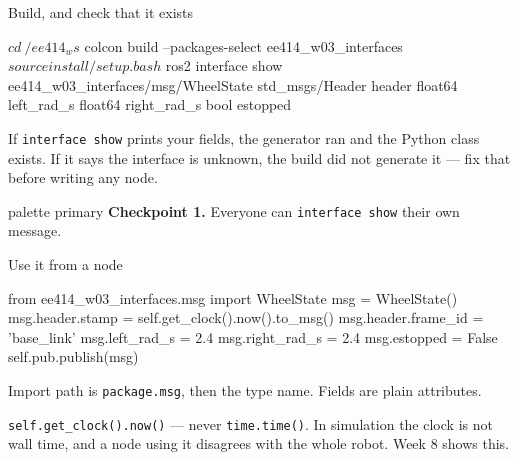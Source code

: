 \documentclass[aspectratio=169]{beamer}
\begin{document}
\begin{frame}[fragile]{Build, and check that it exists}
  \begin{shells}
$ cd ~/ee414_ws
$ colcon build --packages-select ee414_w03_interfaces
$ source install/setup.bash
$ ros2 interface show ee414_w03_interfaces/msg/WheelState
std_msgs/Header header
float64 left_rad_s
float64 right_rad_s
bool estopped
  \end{shells}

  \vspace{0.4em}
  \small
  If \texttt{interface show} prints your fields, the generator ran and the Python class exists.
  If it says the interface is unknown, the build did not generate it --- fix that before
  writing any node.

  \vspace{0.2em}
  \centering
  \begin{beamercolorbox}[sep=5pt,center,rounded=true]{palette primary}
    \footnotesize \textbf{Checkpoint 1.} Everyone can \texttt{interface show} their own message.
  \end{beamercolorbox}
\end{frame}

\begin{frame}[fragile]{Use it from a node}
  \begin{pycodes}
from ee414_w03_interfaces.msg import WheelState
msg = WheelState()
msg.header.stamp = self.get_clock().now().to_msg()
msg.header.frame_id = 'base_link'
msg.left_rad_s  = 2.4
msg.right_rad_s = 2.4
msg.estopped = False
self.pub.publish(msg)
  \end{pycodes}

  \footnotesize
  Import path is \texttt{package.msg}, then the type name. Fields are plain attributes.

  \begin{underhood}
    \footnotesize
    \texttt{self.get\_clock().now()} --- never \texttt{time.time()}. In simulation the clock
    is not wall time, and a node using it disagrees with the whole robot. Week 8 shows this.
  \end{underhood}
\end{frame}
\end{document}
